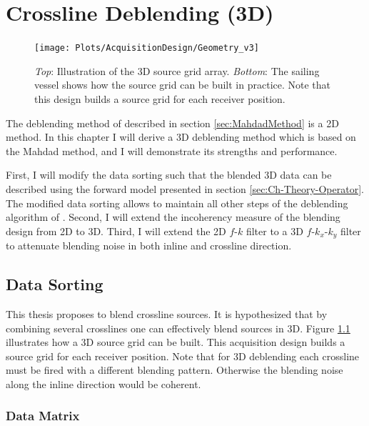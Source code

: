 \chapter{Crossline Deblending (3D)} \label{chap:MahdadMethod3d}

\begin{figure}
	\centering
	\texttt{[image: Plots/AcquisitionDesign/Geometry\_v3]}	
	\caption{\textit{Top}: Illustration of the 3D source grid array. \textit{Bottom}: The sailing vessel shows how the source grid can be built in practice. Note that this design builds a source grid for each receiver position.}
	\label{fig:Ch-Mahdad3d-Geometry_v2}	
\end{figure}

The deblending method of \citet{Mahdad-Deblending-Method} described in section \ref{sec:MahdadMethod} is a 2D method. In this chapter I will derive a 3D deblending method which is based on the Mahdad method, and I will demonstrate its strengths and  performance.

First, I will modify the data sorting such that the blended 3D data can be described using the forward model presented in section \ref{sec:Ch-Theory-Operator}. The modified data sorting allows to maintain all other steps of the deblending algorithm of \citet{Mahdad-Deblending-Method}. Second, I will extend the incoherency measure of the blending design from 2D to 3D. Third, I will extend the 2D $f$-$k$ filter to a 3D $f$-$k_x$-$k_y$ filter to attenuate blending noise in both inline and crossline direction.

\section{Data Sorting} \label{sec:Ch-Theory-3dExtension-DataSorting}

This thesis proposes to blend crossline sources. It is hypothesized that by combining several crosslines one can effectively blend sources in 3D. Figure \ref{fig:Ch-Mahdad3d-Geometry_v2} illustrates how a 3D source grid can be built. This acquisition design builds a source grid for each receiver position. Note that for 3D deblending each crossline must be fired with a different blending pattern. Otherwise the blending noise along the inline direction would be coherent.

\subsection*{Data Matrix}

